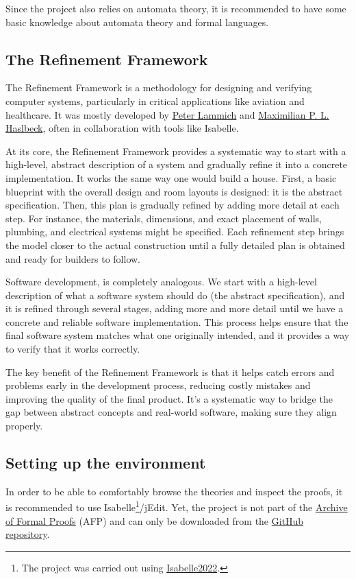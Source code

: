 \documentclass[12pt, a4 paper]{article}
\theoremstyle{definition}
\begin{document}
\bigskip

Since the project also relies on automata theory, it is recommended to have some basic knowledge about automata theory and formal languages.

\subsection{The Refinement Framework}

The Refinement Framework \cite{lammich:ref} is a methodology for designing and verifying computer systems, particularly in critical applications like aviation and healthcare.
It was mostly developed by \href{https://people.utwente.nl/p.lammich}{Peter Lammich} and \href{https://www21.in.tum.de/~haslbema/}{Maximilian P. L. Haslbeck}, often in collaboration with tools like Isabelle.

At its core, the Refinement Framework provides a systematic way to start with a high-level, abstract description of a system and gradually refine it into a concrete implementation.
It works the same way one would build a house. First, a basic blueprint with the overall design and room layouts is designed: it is the abstract specification. Then, this plan is gradually refined by adding more detail at each step. For instance, the materials, dimensions, and exact placement of walls, plumbing, and electrical systems might be specified. Each refinement step brings the model closer to the actual construction until a fully detailed plan is obtained and ready for builders to follow.

Software development, is completely analogous. We start with a high-level description of what a software system should do (the abstract specification), and it is refined through several stages, adding more and more detail until we have a concrete and reliable software implementation. This process helps ensure that the final software system matches what one originally intended, and it provides a way to verify that it works correctly.

The key benefit of the Refinement Framework is that it helps catch errors and problems early in the development process, reducing costly mistakes and improving the quality of the final product. It's a systematic way to bridge the gap between abstract concepts and real-world software, making sure they align properly.

\subsection{Setting up the environment \faGears}
In order to be able to comfortably browse the theories and inspect the proofs, it is recommended to use Isabelle\footnote{The project was carried out using \href{https://isabelle.in.tum.de/}{Isabelle2022}.}/jEdit. Yet, the project is not part of the \href{https://www.isa-afp.org/}{Archive of Formal Proofs} (AFP) and can only be downloaded from the \href{https://github.com/VTrelat/Hopcroft_Verif}{GitHub repository}.
\end{document}
